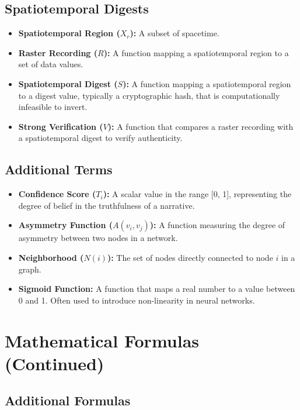\documentclass{article}
\begin{document}
\subsection{Spatiotemporal Digests}

\begin{itemize}
    \item \textbf{Spatiotemporal Region ($X_r$): } A subset of spacetime.
    \item \textbf{Raster Recording ($R$): } A function mapping a spatiotemporal region to a set of data values.
    \item \textbf{Spatiotemporal Digest ($S$): } A function mapping a spatiotemporal region to a digest value, typically a cryptographic hash, that is computationally infeasible to invert.
    \item \textbf{Strong Verification ($V$): } A function that compares a raster recording with a spatiotemporal digest to verify authenticity.
\end{itemize}

\subsection{Additional Terms}

\begin{itemize}
    \item \textbf{Confidence Score ($T_i$): } A scalar value in the range [0, 1], representing the degree of belief in the truthfulness of a narrative.
    \item \textbf{Asymmetry Function ($A(v_i, v_j)$): } A function measuring the degree of asymmetry between two nodes in a network.
    \item \textbf{Neighborhood ($N(i)$): } The set of nodes directly connected to node $i$ in a graph.
    \item \textbf{Sigmoid Function:} A function that maps a real number to a value between 0 and 1. Often used to introduce non-linearity in neural networks.
\end{itemize}



\section{Mathematical Formulas (Continued)}

\subsection{Additional Formulas}
\end{document}

